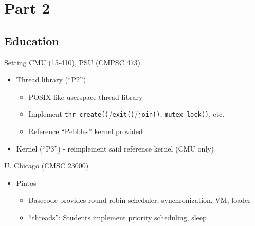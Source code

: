 \documentclass[xcolor=dvipsnames]{beamer}
\newcommand\hilight[2]{\color{#1}#2\color{black}}
\begin{document}

\section{Part 2}
\subsection{Education}

\breakslide{\Large \bf \hilight{sect-410}{Education}}

\begin{frame}{Setting}
	CMU (15-410), PSU (CMPSC 473)
	\begin{itemize}
		\item Thread library (``P2'')
			\begin{itemize}
				\item POSIX-like userspace thread library %
				\item Implement {\tt thr\_create()}/{\tt exit()}/{\tt join()}, {\tt mutex\_lock()}, etc.
				\item Reference ``Pebbles'' kernel provided
			\end{itemize}
		\item Kernel (``P3'') - reimplement said reference kernel (CMU only)
	\end{itemize}
	\pause
	\linegap

	U. Chicago (CMSC 23000)
	\begin{itemize}
		\item Pintos %
		\begin{itemize}
			\item Basecode provides round-robin scheduler, synchronization, VM, loader
			\item ``threads'': Students implement priority scheduling, sleep


\end{itemize}
\end{itemize}
\end{frame}
\end{document}
